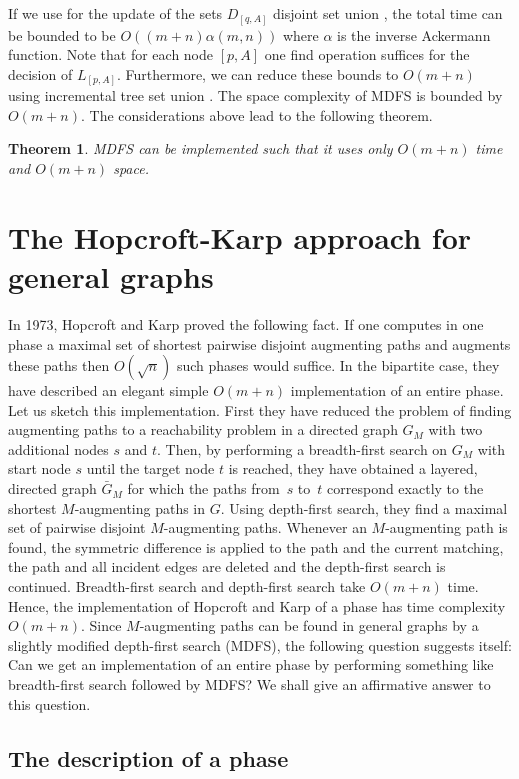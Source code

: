 \documentclass[12pt,twoside,a4paper]{article}
\newtheorem{theo}{Theorem}
\begin{document}
\medskip
If we use for the update of the sets $D_{[q,A]}$ disjoint set 
union \cite{Ta}, the total time can be bounded to be $O((m+n)\alpha(m,n))$
where $\alpha$ is the inverse Ackermann function.
Note that for each node $[p,A]$ one find operation suffices for the decision 
of $L_{[p,A]}$.
Furthermore, we can reduce these bounds to $O(m+n)$ using incremental tree set
union \cite{GaTa}.
The space complexity of MDFS is bounded by $O(m+n)$. The considerations above 
lead to the following theorem.
\begin{theo}
MDFS can be implemented such that it uses only $O(m+n)$ time and $O(m+n)$ 
space.
\end{theo}

\section{The Hopcroft-Karp approach for general graphs}

In 1973, Hopcroft and Karp \cite{HK} proved the following fact. If one computes in 
one phase a maximal set of shortest pairwise disjoint augmenting paths
and augments these paths then $O(\sqrt{n})$ such phases would suffice. 
In the bipartite case, they have described an elegant simple $O(m+n)$ implementation 
of an entire phase. Let us sketch this implementation. First they have reduced 
the problem of finding augmenting paths to a reachability problem in a directed
graph $G_M$ with two additional nodes $s$ and $t$.
Then, by performing a breadth-first search on $G_M$ with start node $s$
until the target node $t$ is reached, they have obtained a layered, directed
graph $\bar{G}_M$ for which the paths from~$s$ to~$t$ correspond exactly to
the shortest $M$-augmenting paths in $G$. Using depth-first search, they find a
maximal set of pairwise disjoint $M$-augmenting paths. Whenever an $M$-augmenting path
is found, the symmetric difference is applied to the path and the current matching, 
the path and all incident edges are deleted and the depth-first search is continued. 
Breadth-first search and depth-first search
take $O(m+n)$ time. Hence, the implementation of Hopcroft and Karp  of a phase has 
time complexity $O(m+n)$.
Since $M$-augmenting paths can be found in general graphs by a slightly modified 
depth-first search (MDFS), the following question suggests itself:
Can we get an implementation of an entire phase by performing something like
breadth-first search followed by MDFS?
We shall give an affirmative answer to this question.

\subsection{The description of a phase}
\end{document}
